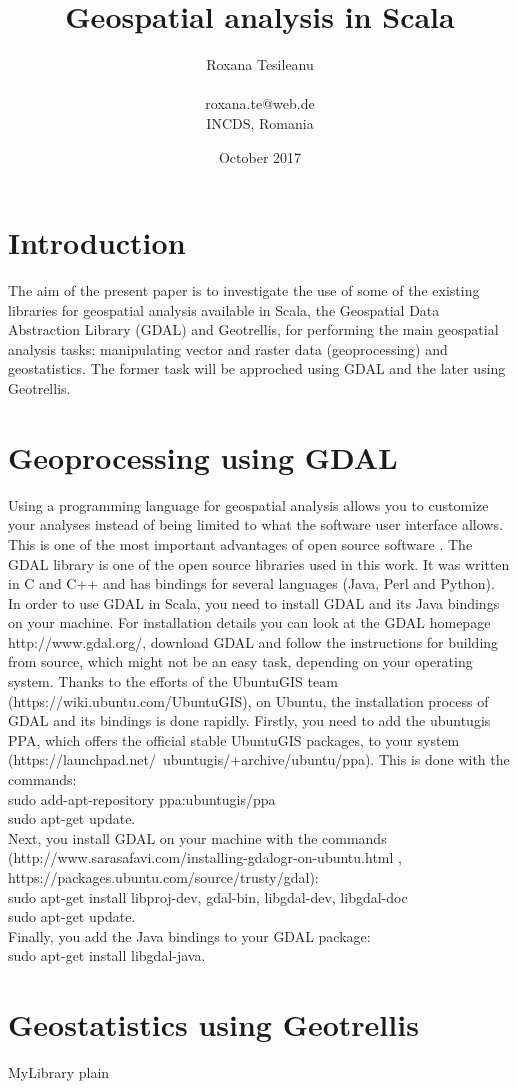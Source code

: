 \documentclass {article}
\title {Geospatial analysis in Scala}
\date {October 2017}
\author {Roxana Tesileanu \\
\\
roxana.te@web.de \\
INCDS, Romania}
\begin{document}
	\maketitle

\tableofcontents

\section {Introduction}

The aim of the present paper is to investigate the use of some of the existing libraries for geospatial analysis available in Scala, the Geospatial Data Abstraction Library (GDAL) and Geotrellis, for performing the main geospatial analysis tasks: manipulating vector and raster data (geoprocessing) and geostatistics.
The former task will be approched using GDAL and the later using Geotrellis.  

\section {Geoprocessing using GDAL}

Using a programming language for geospatial analysis allows you to customize your analyses instead of being limited to what the software user interface allows. This is one of the most important advantages of open source software \cite{garrard_geoprocessing_2016}. The GDAL library is one of the open source libraries used in this work. It was written in C and C++ and has bindings for several languages (Java, Perl and Python).     
In order to use GDAL in Scala, you need to install GDAL and its Java bindings on your machine.  
For installation details you can look at the GDAL homepage http://www.gdal.org/, download GDAL and follow the instructions for building from source, which might not be an easy task, depending on your operating system. 
Thanks to the efforts of the UbuntuGIS team (https://wiki.ubuntu.com/UbuntuGIS), on Ubuntu, the installation process of GDAL and its bindings is done rapidly. Firstly, you need to add the ubuntugis PPA, which offers the official stable UbuntuGIS packages, to your system (https://launchpad.net/~ubuntugis/+archive/ubuntu/ppa). This is done with the commands: \\
sudo add-apt-repository ppa:ubuntugis/ppa \\
sudo apt-get update.\\
Next, you install GDAL on your machine with the commands (http://www.sarasafavi.com/installing-gdalogr-on-ubuntu.html , https://packages.ubuntu.com/source/trusty/gdal):\\
sudo apt-get install libproj-dev, gdal-bin, libgdal-dev, libgdal-doc \\
sudo apt-get update.\\
Finally, you add the Java bindings to your GDAL package:\\
sudo apt-get install libgdal-java.    \\


  

\section {Geostatistics using Geotrellis}

 {MyLibrary}
 {plain}
\end{document}
